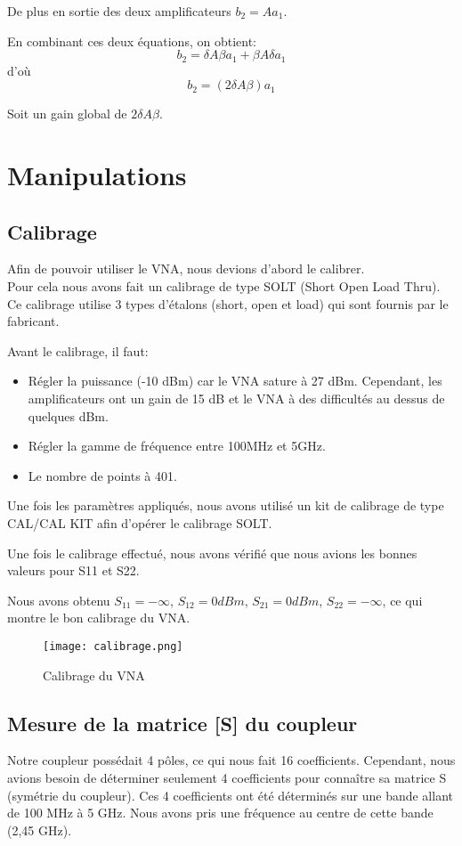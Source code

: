 \documentclass[oneside,a4paper,12pt]{article}
\begin{document}
	De plus en sortie des deux amplificateurs $ b_{2} = A a_{1} $.

	En combinant ces deux équations, on obtient:
	\[ b_{2} = \delta A \beta a_{1} + \beta A \delta a_{1} \]
	d'o\`u 
	\[ b_{2} = (2 \delta A \beta) a_{1} \]
	
	Soit un gain global de $ 2 \delta A \beta $.
	\newpage

	\section{Manipulations}
	\subsection{Calibrage}
	Afin de pouvoir utiliser le VNA, nous devions d’abord le calibrer.\\ 
	Pour cela nous avons fait un calibrage de type SOLT (Short Open Load Thru).\\
	Ce calibrage utilise 3 types d’étalons (short, open et load) qui sont fournis par le fabricant.

	Avant le calibrage, il faut:
	\begin{itemize}
		\item Régler la puissance (-10 dBm) car le VNA sature à 27 dBm. Cependant, les amplificateurs ont un gain de 15 dB et le VNA à des difficultés au dessus de quelques dBm.
		\item Régler la gamme de fréquence entre 100MHz et 5GHz.
		\item Le nombre de points à 401.
	\end{itemize}

	Une fois les paramètres appliqués, nous avons utilisé un kit de calibrage de type CAL/CAL KIT afin d’opérer le calibrage SOLT.

	Une fois le calibrage effectué, nous avons vérifié que nous avions les bonnes valeurs pour S11 et S22.

	Nous avons obtenu $S_{11} = -\infty$, $S_{12} = 0 dBm$, $S_{21} = 0 dBm$, $S_{22} = -\infty$, ce qui montre le bon calibrage du VNA. 

	\begin{figure}[h]
		\centering
		\texttt{[image: calibrage.png]}
		\caption{Calibrage du VNA}
	\end{figure}

	\subsection{Mesure de la matrice [S] du coupleur}
	Notre coupleur possédait 4 pôles, ce qui nous fait 16 coefficients. 
	Cependant, nous avions besoin de déterminer seulement 4 coefficients pour connaître sa matrice S (symétrie du coupleur). 
	Ces 4 coefficients ont été déterminés sur une bande allant de 100 MHz à 5 GHz. 
	Nous avons pris une fréquence au centre de cette bande (2,45 GHz).
\end{document}
